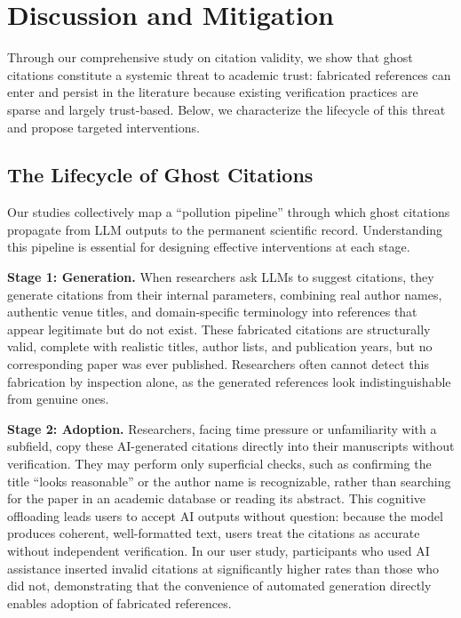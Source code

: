 \section{Discussion and Mitigation}
\label{sec:discussion}


Through our comprehensive study on citation validity, we show that ghost citations constitute a systemic threat to academic trust: fabricated references can enter and persist in the literature because existing verification practices are sparse and largely trust-based.
Below, we characterize the lifecycle of this threat and propose targeted interventions.
\subsection{The Lifecycle of Ghost Citations}

Our studies collectively map a ``pollution pipeline'' through which ghost citations propagate from LLM outputs to the permanent scientific record.
Understanding this pipeline is essential for designing effective interventions at each stage.

\noindent
\textbf{Stage 1: Generation.}
When researchers ask LLMs to suggest citations, they generate citations from their internal parameters, combining real author names, authentic venue titles, and domain-specific terminology into references that appear legitimate but do not exist. 
These fabricated citations are structurally valid, complete with realistic titles, author lists, and publication years, but no corresponding paper was ever published. Researchers often cannot detect this fabrication by inspection alone, as the generated references look indistinguishable from genuine ones.

\noindent
\textbf{Stage 2: Adoption.}
Researchers, facing time pressure or unfamiliarity with a subfield, copy these AI-generated citations directly into their manuscripts without verification. 
They may perform only superficial checks, such as confirming the title ``looks reasonable'' or the author name is recognizable, rather than searching for the paper in an academic database or reading its abstract. This cognitive offloading leads users to accept AI outputs without question: because the model produces coherent, well-formatted text, users treat the citations as accurate without independent verification. In our user study, participants who used AI assistance inserted invalid citations at significantly higher rates than those who did not, demonstrating that the convenience of automated generation directly enables adoption of fabricated references.


